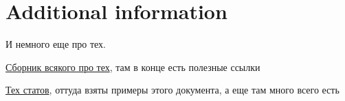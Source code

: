 \section{Additional information}


И немного еще про тех.

\href{https://www.overleaf.com/read/hgdqksrpzrbt}{Сборник всякого про тех}, там в конце есть полезные ссылки

\href{https://www.overleaf.com/read/wjxtxpszwmgv}{Тех статов}, оттуда взяты примеры этого документа, а еще там много всего есть
